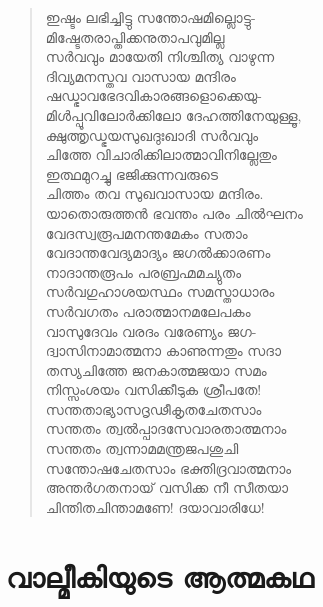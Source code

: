 \begin{verse}
ഇഷ്ടം ലഭിച്ചിട്ടു സന്തോഷമില്ലൊട്ടു-\\
മിഷ്ടേതരാപ്തിക്കനുതാപവുമില്ല\\
സര്‍വവും മായേതി നിശ്ചിത്യ വാഴുന്ന\\
ദിവ്യമനസ്തവ വാസായ മന്ദിരം\\
ഷഡ്ഭാവഭേദവികാരങ്ങളൊക്കെയു-\\
മിള്‍പ്പൂവിലോര്‍ക്കിലോ ദേഹത്തിനേയുള്ളൂ,\\
ക്ഷുത്തൃഡ്ഭയസുഖദുഃഖാദി സര്‍വവും\\
ചിത്തേ വിചാരിക്കിലാത്മാവിനില്ലേതും\\
ഇത്ഥമുറച്ചു ഭജിക്കുന്നവരുടെ\\
ചിത്തം തവ സുഖവാസായ മന്ദിരം.\\
യാതൊരുത്തന്‍ ഭവന്തം പരം ചില്‍ഘനം\\
വേദസ്വരൂപമനന്തമേകം സതാം\\
വേദാന്തവേദ്യമാദ്യം ജഗല്‍ക്കാരണം\\
നാദാന്തരൂപം പരബ്രഹ്മമച്യുതം\\
സര്‍വഗുഹാശയസ്ഥം സമസ്താധാരം\\
സര്‍വഗതം പരാത്മാനമലേപകം\\
വാസുദേവം വരദം വരേണ്യം ജഗ-\\
ദ്വാസിനാമാത്മനാ കാണുന്നതും സദാ\\
തസ്യചിത്തേ ജനകാത്മജയാ സമം\\
നിസ്സംശയം വസിക്കീടുക ശ്രീപതേ!\\
സന്തതാഭ്യാസദൃഢീകൃതചേതസാം\\
സന്തതം ത്വല്‍പ്പാദസേവാരതാത്മനാം\\
സന്തതം ത്വന്നാമമന്ത്രജപശുചി\\
സന്തോഷചേതസാം ഭക്തിദ്രവാത്മനാം\\
അന്തര്‍ഗതനായ് വസിക്ക നീ സീതയാ\\
ചിന്തിതചിന്താമണേ! ദയാവാരിധേ!
\end{verse}


\section{വാല്മീകിയുടെ ആത്മകഥ}

